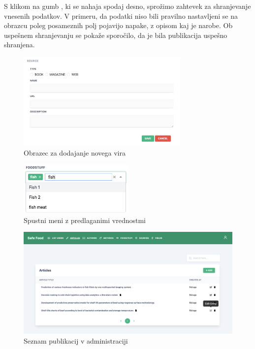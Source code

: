\documentclass[a4paper, 12pt]{book}
\begin{document}
S klikom na gumb , ki se nahaja spodaj desno, sprožimo zahtevek za shranjevanje vnesenih podatkov. V primeru, da podatki niso bili pravilno nastavljeni se na obrazcu poleg posameznih polj pojavijo napake, z opisom kaj je narobe. Ob uspešnem shranjevanju se pokaže sporočilo, da je bila publikacija uspešno shranjena. 

\begin{figure}[h]
\begin{center}
\includegraphics[width=0.75\textwidth]{slike/add-source.png}
\end{center}
\caption{ Obrazec za dodajanje novega vira }
\label{add-source}
\end{figure}


\begin{figure}[h]
\begin{center}
\includegraphics[width=0.5\textwidth]{slike/multiselect.png}
\end{center}
\caption{ Spustni meni z predlaganimi vrednostmi }
\label{multiselect}
\end{figure}

\begin{figure}[h]
\begin{center}
\includegraphics[width=1\textwidth]{slike/list-articles.png}
\end{center}
\caption{ Seznam publikacij v administraciji }
\label{list-articles}
\end{figure}
\end{document}
